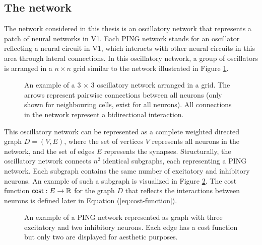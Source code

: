 \subsection{The network}
\label{sec:grid-network}

The network considered in this thesis is an oscillatory network that represents a patch of neural networks in V1. Each PING network stands for an oscillator reflecting a neural circuit in V1, which interacts with other neural circuits in this area through lateral connections.
In this oscillatory network, a group of oscillators is arranged in a $n \times n$ grid similar to the network illustrated in Figure \ref{fig:oscillatory-grid-graph}.

\begin{figure}[!htp]
    \centering
    
    \caption{An example of a 3 $\times$ 3 oscillatory network arranged in a grid. The arrows represent pairwise connections between all neurons (only shown for neighbouring cells, exist for all neurons). All connections in the network represent a bidirectional interaction.}
    \label{fig:oscillatory-grid-graph}
\end{figure}

This oscillatory network can be represented as a complete weighted directed graph $D = (V, E)$, where the set of vertices $V$ represents all neurons in the network, and the set of edges $E$ represents the synapses. Structurally, the oscillatory network connects $n^2$ identical subgraphs, each representing a PING network. Each subgraph contains the same number of excitatory and inhibitory neurons. An example of such a subgraph is visualized in Figure \ref{fig:single-ping-graph}. 
The cost function $\mathsf{cost}: E \to \mathbb{R}$ for the graph $D$ that reflects the interactions between neurons is defined later in Equation (\ref{eq:cost-function}).

\begin{figure}[!htp]
    \centering
    
    \caption{An example of a PING network represented as graph with three excitatory and two inhibitory neurons. Each edge has a cost function but only two are displayed for aesthetic purposes.}
    \label{fig:single-ping-graph}
\end{figure}

